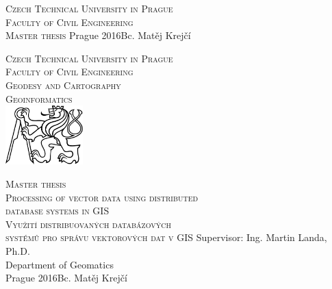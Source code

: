 \begin{center}
\newcommand{\napisCVUT}{Czech Technical University in Prague}
\newcommand{\napisFS}{Faculty of Civil Engineering}
\newcommand{\napisProgram}{Geodesy and Cartography}
\newcommand{\napisObor}{Geoinformatics}
\newcommand{\napisKatedra}{Department of Geomatics}
\newcommand{\napisVedouci}{Ing. Martin Landa, Ph.D.}
\newcommand{\napisAutor}{Bc. Matěj Krejčí}
\newcommand{\napisDatum}{Prague 2016}
\newcommand{\napisNazevI}{Processing of vector data using distributed}
\newcommand{\napisNazevII}{database systems in GIS}
\newcommand{\napisNazevAjI}{Využití distribuovaných databázových}
\newcommand{\napisNazevAjII}{ systémů pro správu vektorových dat v GIS}
\newcommand{\napisBakalarka}{Master thesis}
\newcommand{\napisPraha}{Prague 2016}
%
\newcommand{\velka}[1]{\textsc{#1}}
%
% 
\newif\ifpatitul
\patitultrue

\ifpatitul
{\Large\velka{\napisCVUT}}\\
\velka{\Large\napisFS}\\
\vfill
{\LARGE\velka{\napisBakalarka}}
\vfill
{\large\napisPraha\hfill\napisAutor}
\newpage
\fi%


{\Large\velka{\napisCVUT}}\\
{\Large\velka{\napisFS}}\\
{\Large\velka{\napisProgram}}\\
{\Large\velka{\napisObor}}\\
\vfill
\includegraphics[width=3cm]{logo_cvut_cb} %
\vfill

{\Large\velka{\napisBakalarka}}\\
{\Large\velka{\napisNazevI\\
\napisNazevII}}\\
{\large\velka{\napisNazevAjI\\
\napisNazevAjII}}
\vfill
{\large%
Supervisor: \napisVedouci\\
\napisKatedra\\
\bigskip
\napisDatum\hfill\napisAutor}
\end{center}
